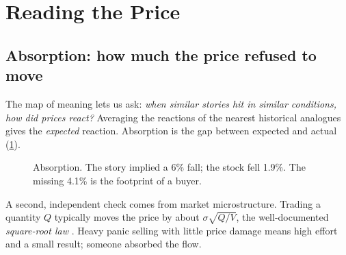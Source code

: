 \documentclass[11pt,a4paper]{article}
\begin{document}
\section{Reading the Price}

\subsection{Absorption: how much the price refused to move}

The map of meaning lets us ask: \emph{when similar stories hit in similar conditions, how did prices react?} Averaging the reactions of the nearest historical analogues gives the \emph{expected} reaction. Absorption is the gap between expected and actual (\cref{fig:absorb}).

\begin{figure}[ht]
\centering
{}
\caption{Absorption. The story implied a 6\% fall; the stock fell 1.9\%. The missing 4.1\% is the footprint of a buyer.}
\label{fig:absorb}
\end{figure}

A second, independent check comes from market microstructure. Trading a quantity $Q$ typically moves the price by about $\sigma\sqrt{Q/V}$, the well-documented \emph{square-root law} \citep{bouchaud2018}. Heavy panic selling with little price damage means high effort and a small result; someone absorbed the flow.
\end{document}
